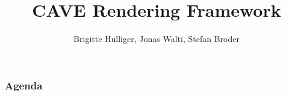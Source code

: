 \documentclass[11pt,a4paper]{beamer}
\title{CAVE Rendering Framework}
\author{Brigitte Hulliger, Jonas Walti, Stefan Broder}
\begin{document}
\maketitle

\begin{frame}\frametitle{Agenda}
	\tableofcontents
\end{frame}








\end{document}

